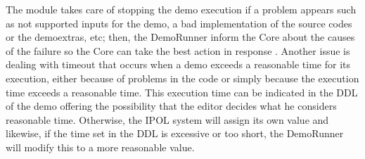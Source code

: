 The module takes care of stopping the demo execution if a problem appears such as not supported inputs for the demo, a bad implementation of the source codes or the demoextras, etc;  then, the DemoRunner inform the Core  about the causes of the failure so the Core can take the best action in response . Another issue is dealing with timeout  that occurs when a demo exceeds a reasonable time for its execution, either because of problems in the code or simply because the execution time exceeds a reasonable time. This execution time can be indicated in the DDL of the demo offering the possibility that the editor decides what he  considers reasonable time. Otherwise, the IPOL system will assign its own value and likewise, if the time set in the DDL is excessive or too short, the DemoRunner will modify this to a more reasonable value. 

